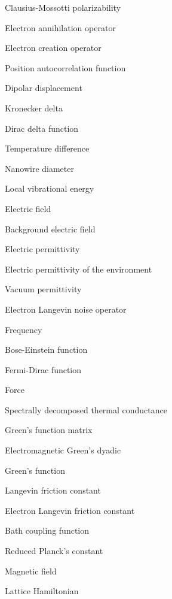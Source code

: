 \documentclass[dissertation,draft*]{aaltoseries}
\newcommand{\bb}{\mathbf}
\newcommand{\bE}{\bb{E}}
\newcommand{\Eenv}{\bb{E}_{\textrm{env}}}
\begin{document}
\begin{description} \itemsep2pt
  \item[$\alpha^{\textrm{CM}}$] Clausius-Mossotti polarizability
  \item[$c$] Electron annihilation operator 
  \item[$c^{\dagger}$] Electron creation operator 
  \item[$C$] Position autocorrelation function
  \item[$d$] Dipolar displacement 
  \item[$\delta_{ij}$] Kronecker delta
   \item[$\delta(x-x')$] Dirac delta function
  \item[$\Delta T$] Temperature difference
  \item[$D$] Nanowire diameter
    \item[$e$] Local vibrational energy
   \item[$\bE$] Electric field  
   \item[$\Eenv$] Background electric field
   \item[$\varepsilon$] Electric permittivity
   \item[$\varepsilon_{\textrm{env}}$] Electric permittivity of the environment
   \item[$\varepsilon_0$] Vacuum permittivity
   \item[$\eta$] Electron Langevin noise operator
   \item[$f$] Frequency
   \item[$f_{\textrm{BE}}$] Bose-Einstein function
    \item[$f_{\textrm{FD}}$] Fermi-Dirac function
  \item[$\bb{F}$] Force
  \item[$g$] Spectrally decomposed thermal conductance
  \item[$\bb{G}$] Green's function matrix
  \item[$\mathbb{G}$] Electromagnetic Green's dyadic
  \item[GF] Green's function 
  \item[$\gamma$] Langevin friction constant
  \item[$\gamma_e$] Electron Langevin friction constant
  \item[$\Gamma$] Bath coupling function
  \item[$\hbar$] Reduced Planck's constant
  \item[$\bb{H}$] Magnetic field 
  \item[$\mathcal{H}_\textrm{ph}$] Lattice Hamiltonian

\end{description}
\end{document}
